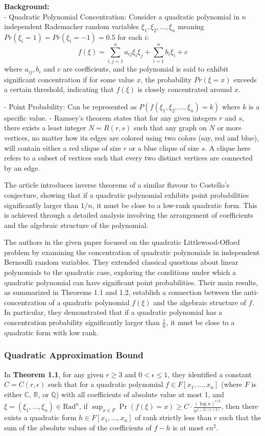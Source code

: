 


\textbf{Background:}\\
- Quadratic Polynomial Concentration: Consider a quadratic polynomial
in ${n}$ independent Rademacher random variables 
${\xi_1, \xi_2,...,\xi_n}$ meaning ${Pr(\xi_i=1)=Pr(\xi_i=-1)=0.5}$ 
for each ${i}$:
$${f(\xi)=\sum_{i,j=1}^{n} a_{ij} \xi_i \xi_j + \sum_{i=1}^{n} b_i \xi_i + c}$$
where ${a_{ij},b_i}$ and ${c}$ are coefficients,
and the polynomial is said to exhibit significant 
concentration if for some value ${x}$, the probability
${Pr(\xi=x)}$ exceeds a certain threshold, indicating 
that ${f(\xi)}$ is closely concentrated around ${x}$.

- Point Probability: Can be represented as ${P(f(\xi_1, \xi_2,...,\xi_n) = k)}$ where ${k}$ is a specific value.
- Ramsey's theorem states that for any given integers ${r}$ and ${s}$,
there exists a least integer ${N=R(r,s)}$ 
such that any graph on ${N}$ or more vertices,
no matter how its edges are colored using two colors
(say, red and blue), will contain either a red clique of size ${r}$
or a blue clique of size ${s}$.
A clique here refers to a subset of vertices such that every two distinct
vertices are connected by an edge.

The article introduces inverse theorems of a similar flavour to Costello's
conjecture, showing that if a quadratic polynomial exhibits point
probabilities significantly larger than ${1/n}$,
it must be close to a low-rank quadratic form.
This is achieved through a detailed analysis
involving the arrangement of coefficients
and the algebraic structure of the polynomial.

The authors in the given paper focused on the quadratic
Littlewood-Offord problem by examining the concentration
of quadratic polynomials in independent Bernoulli random
variables. They extended classical questions about linear
polynomials to the quadratic case, exploring the
conditions under which a quadratic polynomial can have
significant point probabilities. Their main results,
as summarized in Theorems 1.1 and 1.2, establish a connection
between the anti-concentration of a quadratic polynomial 
$f(\xi)$ and the algebraic structure of $f$.
In particular,
they demonstrated that if a quadratic polynomial has a 
concentration probability significantly
larger than $\frac{1}{n}$, it must be close to
a quadratic form with low rank.

\subsubsection{Quadratic Approximation Bound}
In \textbf{Theorem 1.1}, for any given $r \geq 3$ and
$0 < \epsilon \leq 1$, they identified a constant
$C = C(r, \epsilon)$ such that for a quadratic polynomial
$f \in F[x_1, \dots, x_n]$ (where $F$ is either 
$\mathbb{C}$, $\mathbb{R}$, or $\mathbb{Q}$) with all coefficients
of absolute value at most 1, and
$\xi = (\xi_1, \dots, \xi_n) \in \text{Rad}^n$, if
${\sup_{x \in F} \Pr(f(\xi) = x) \geq C \cdot \frac{(\log n)^{r/2}}{n^{1-2/(r+2)}}}$,
then there exists a quadratic form
$h \in F[x_1, \dots, x_n]$ of rank strictly less than $r$
such that the sum of the absolute values of the coefficients
of $f - h$ is at most $\epsilon n^2$.
 
